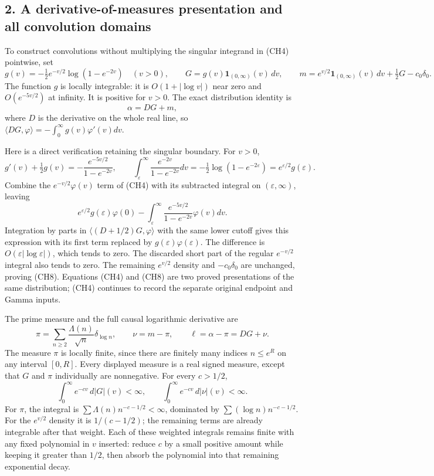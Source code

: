 \documentclass[
  10pt,
  a4paper,
]{article}
\begin{document}
\subsection{2. A derivative-of-measures presentation and all convolution
domains}\label{a-derivative-of-measures-presentation-and-all-convolution-domains}

To construct convolutions without multiplying the singular integrand in
(CH4) pointwise, set \[
g(v)=-\tfrac12e^{-v/2}\log(1-e^{-2v})\quad(v>0),\qquad
G=g(v)\mathbf1_{(0,\infty)}(v)\,dv,
\qquad
m=e^{v/2}\mathbf1_{(0,\infty)}(v)\,dv+\tfrac12G-c_0\delta_0.
\tag{CH7}
\] The function \(g\) is locally integrable: it is \(O(1+|\log v|)\)
near zero and \(O(e^{-5v/2})\) at infinity. It is positive for \(v>0\).
The exact distribution identity is \[
\boxed{\alpha=DG+m,}
\tag{CH8}
\] where \(D\) is the derivative on the whole real line, so
\(\langle DG,\varphi\rangle=-\int_0^\infty g(v)\varphi'(v)dv\).

Here is a direct verification retaining the singular boundary. For
\(v>0\), \[
g'(v)+\tfrac12g(v)=-\frac{e^{-5v/2}}{1-e^{-2v}},\qquad
\int_\varepsilon^\infty\frac{e^{-2v}}{1-e^{-2v}}dv
=-\tfrac12\log(1-e^{-2\varepsilon})=e^{\varepsilon/2}g(\varepsilon).
\tag{CH9}
\] Combine the \(e^{-v/2}\varphi(v)\) term of (CH4) with its subtracted
integral on \((\varepsilon,\infty)\), leaving \[
e^{\varepsilon/2}g(\varepsilon)\varphi(0)
-\int_\varepsilon^\infty\frac{e^{-5v/2}}{1-e^{-2v}}\varphi(v)dv.
\] Integration by parts in \(\langle(D+1/2)G,\varphi\rangle\) with the
same lower cutoff gives this expression with its first term replaced by
\(g(\varepsilon)\varphi(\varepsilon)\). The difference is
\(O(\varepsilon|\log\varepsilon|)\), which tends to zero. The discarded
short part of the regular \(e^{-v/2}\) integral also tends to zero. The
remaining \(e^{v/2}\) density and \(-c_0\delta_0\) are unchanged,
proving (CH8). Equations (CH4) and (CH8) are two proved presentations of
the same distribution; (CH4) continues to record the separate original
endpoint and Gamma inputs.

The prime measure and the full causal logarithmic derivative are \[
\pi=\sum_{n\ge2}\frac{\Lambda(n)}{\sqrt n}\delta_{\log n},
\qquad \nu=m-\pi,\qquad \ell=\alpha-\pi=DG+\nu.
\tag{CH10}
\] The measure \(\pi\) is locally finite, since there are finitely many
indices \(n\le e^R\) on any interval \([0,R]\). Every displayed measure
is a real signed measure, except that \(G\) and \(\pi\) individually are
nonnegative. For every \(c>1/2\), \[
\int_0^\infty e^{-cv}\,d|G|(v)<\infty,\qquad
\int_0^\infty e^{-cv}\,d|\nu|(v)<\infty.
\tag{CH11}
\] For \(\pi\), the integral is \(\sum\Lambda(n)n^{-c-1/2}<\infty\),
dominated by \(\sum(\log n)n^{-c-1/2}\). For the \(e^{v/2}\) density it
is \(1/(c-1/2)\); the remaining terms are already integrable after that
weight. Each of these weighted integrals remains finite with any fixed
polynomial in \(v\) inserted: reduce \(c\) by a small positive amount
while keeping it greater than \(1/2\), then absorb the polynomial into
that remaining exponential decay.
\end{document}
